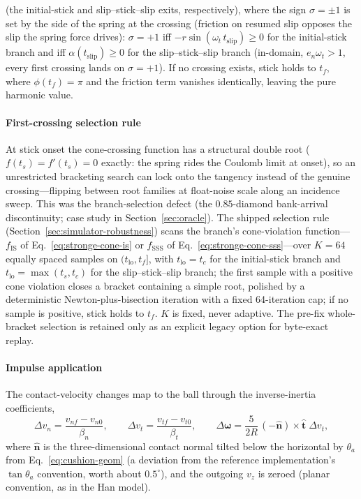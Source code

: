 (the initial-stick and slip--stick--slip exits, respectively),
where the sign $\sigma = \pm 1$ is set by the side of the spring at
the crossing (friction on resumed slip opposes the slip the spring
force drives): $\sigma = +1$ iff
$-r\sin(\omega_t\,t_{\mathrm{slip}}) \ge 0$ for the initial-stick
branch and iff $\alpha(t_{\mathrm{slip}}) \ge 0$ for the
slip--stick--slip branch (in-domain, $e_n\omega_t > 1$, every first
crossing lands on $\sigma = +1$). If no crossing exists, stick holds
to $t_f$, where $\phi(t_f) = \pi$ and the friction term vanishes
identically, leaving the pure harmonic value.

\paragraph{First-crossing selection rule} At stick onset the
cone-crossing function has a structural double root
($f(t_s) = f'(t_s) = 0$ exactly: the spring rides the Coulomb limit at
onset), so an unrestricted bracketing search can lock onto the
tangency instead of the genuine crossing---flipping between root
families at float-noise scale along an incidence sweep. This was
the branch-selection defect (the $0.85$-diamond bank-arrival
discontinuity; case study
in Section~\ref{sec:oracle}). The shipped selection rule
(Section~\ref{sec:simulator-robustness}) scans the branch's
cone-violation function---$f_{\mathrm{IS}}$ of
Eq.~\eqref{eq:stronge-cone-is} or $f_{\mathrm{SSS}}$ of
Eq.~\eqref{eq:stronge-cone-sss}---over $K = 64$ equally spaced samples
on $(t_{\mathrm{lo}}, t_f]$, with $t_{\mathrm{lo}} = t_c$ for the
initial-stick branch and $t_{\mathrm{lo}} = \max(t_s, t_c)$ for the
slip--stick--slip branch; the first sample with a positive cone
violation closes a bracket containing a simple root, polished by a
deterministic Newton-plus-bisection iteration with a fixed
64-iteration cap; if no sample is positive, stick holds to $t_f$. $K$
is fixed, never adaptive. The pre-fix whole-bracket selection is
retained only as an explicit legacy option for byte-exact replay.

\paragraph{Impulse application} The contact-velocity changes map to
the ball through the inverse-inertia coefficients,
\begin{equation}
\Delta v_n = \frac{v_{nf} - v_{n0}}{\beta_n}, \qquad
\Delta v_t = \frac{v_{tf} - v_{t0}}{\beta_t}, \qquad
\Delta\boldsymbol{\omega} = \frac{5}{2R}\,
(-\hat{\mathbf{n}})\times\hat{\mathbf{t}}\;\Delta v_t,
\label{eq:stronge-apply}
\end{equation}
where $\hat{\mathbf{n}}$ is the three-dimensional contact normal
tilted below the horizontal by $\theta_a$ from
Eq.~\eqref{eq:cushion-geom} (a deviation from the reference
implementation's $\tan\theta_a$ convention, worth about $0.5^\circ$),
and the outgoing $v_z$ is zeroed (planar convention, as in the Han
model).

